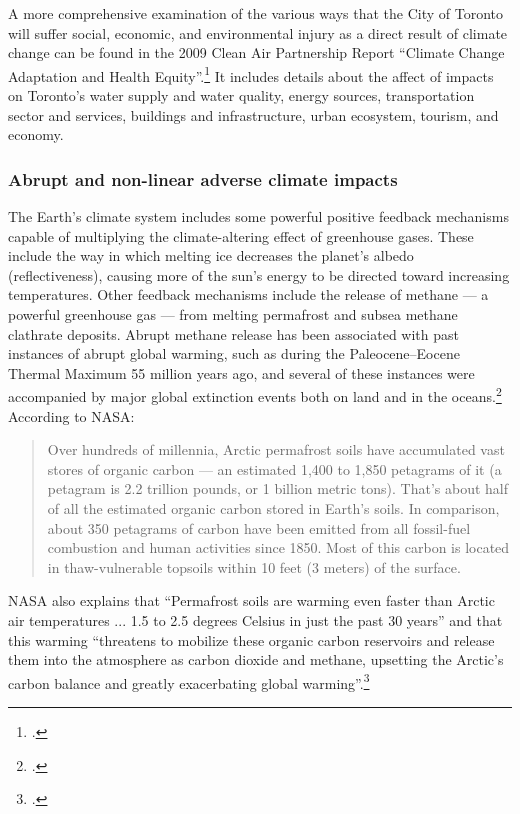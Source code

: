 A more comprehensive examination of the various ways that the City of Toronto will suffer social, economic, and environmental injury as a direct result of climate change can be found in the 2009 Clean Air Partnership Report ``Climate Change Adaptation and Health Equity''.\footcite[][]{CCAHealthEquity}
It includes details about the affect of impacts on Toronto's water supply and water quality, energy sources, transportation sector and services, buildings and infrastructure, urban ecosystem, tourism, and economy.  



	\subsubsection{Abrupt and non-linear adverse climate impacts}



The Earth's climate system includes some powerful positive feedback mechanisms capable of multiplying the climate-altering effect of greenhouse gases.
These include the way in which melting ice decreases the planet's albedo (reflectiveness), causing more of the sun's energy to be directed toward increasing temperatures.
Other feedback mechanisms include the release of methane --- a powerful greenhouse gas --- from melting permafrost and subsea methane clathrate deposits.
Abrupt methane release has been associated with past instances of abrupt global warming, such as during the Paleocene–Eocene Thermal Maximum 55 million years ago, and several of these instances were accompanied by major global extinction events both on land and in the oceans.\footcite[See: ][]{Hansen2010}
According to NASA:
\begin{quote}
Over hundreds of millennia, Arctic permafrost soils have accumulated vast stores of organic carbon --- an estimated 1,400 to 1,850 petagrams of it (a petagram is 2.2 trillion pounds, or 1 billion metric tons). That's about half of all the estimated organic carbon stored in Earth's soils. In comparison, about 350 petagrams of carbon have been emitted from all fossil-fuel combustion and human activities since 1850. Most of this carbon is located in thaw-vulnerable topsoils within 10 feet (3 meters) of the surface.
\end{quote}
NASA also explains that ``Permafrost soils are warming even faster than Arctic air temperatures ... 1.5 to 2.5 degrees Celsius in just the past 30 years'' and that this warming ``threatens to mobilize these organic carbon reservoirs and release them into the atmosphere as carbon dioxide and methane, upsetting the Arctic's carbon balance and greatly exacerbating global warming''.\footcite[][]{SleepingGiant}



